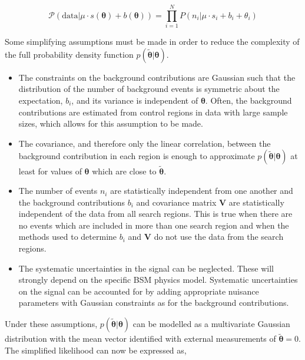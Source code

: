 \begin{equation}
\mathcal{P}(\mathrm{data}|\mu\cdot s(\boldsymbol{\theta}) + b(\boldsymbol{\theta})) = \prod_{i=1}^{N} P(n_{i}|\mu \cdot s_{i}+b_{i}+\theta_{i})
\label{eq:poisson-prob}
\end{equation}

Some simplifying assumptions must be made in order to reduce the complexity of the full probability density function $p(\tilde{\boldsymbol{\theta}}|\boldsymbol{\theta})$. 

\begin{itemize}
\item{The constraints on the background contributions are Gaussian such that the distribution of the number of background events is symmetric about the expectation, $b_{i}$, 
and its variance is independent of $\boldsymbol{\theta}$. Often, the background contributions are estimated from control regions in data with large sample sizes, which allows for this 
assumption to be made.}

\item{The covariance, and therefore only the linear correlation, between the background contribution in each region is enough to approximate $p(\tilde{\boldsymbol{\theta}}|\boldsymbol{\theta})$ 
at least for values of $\boldsymbol{\theta}$ which are close to $\tilde{\boldsymbol{\theta}}$.}

\item{The number of events $n_{i}$ are statistically independent from one another and the background contributions $b_{i}$ and covariance matrix $\mathrm{\mathbf{V}}$ are 
statistically independent of the data from all search regions. This is true when there are no events which are included in more than one search region and when the methods used to 
determine $b_{i}$ and $\mathrm{\mathbf{V}}$ do not use the data from the search regions.}

\item{The systematic uncertainties in the signal can be neglected. These will strongly depend on the specific BSM physics model. 
Systematic uncertainties on the signal can be accounted for by adding appropriate nuisance parameters with Gaussian constraints 
as for the background contributions. }
\end{itemize}

Under these assumptions, $p(\tilde{\boldsymbol{\theta}}|\boldsymbol{\theta})$ can be modelled as a multivariate Gaussian distribution with the mean vector identified with external measurements of 
$\tilde{\boldsymbol{\theta}}=0$. The simplified likelihood can now be expressed as,

